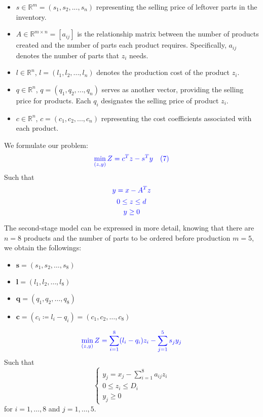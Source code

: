 \documentclass[a4paper]{article}
\begin{document}
	\begin{itemize}
		\item $s \in \mathbb{R}^m = (s_1, s_2, ..., s_n)$ representing the selling price of leftover parts in the inventory.
		\item $A \in \mathbb{R}^{m \times n} = [a_{ij}]$ is the relationship matrix between the number of products created and the number of parts each product requires. Specifically, $a_{ij}$ denotes the number of parts that $z_i$ needs.
	\end{itemize}
	\begin{itemize}
		\item $l \in \mathbb{R}^n$, $l = (l_1, l_2, ..., l_n)$ denotes the production cost of the product $z_i$.
		\item $q \in \mathbb{R}^n$, $q = (q_1, q_2, ..., q_n)$ serves as another vector, providing the selling price for products. Each $q_i$ designates the selling price of product $z_i$.
		\item $c \in \mathbb{R}^n$, $c = (c_1, c_2, ..., c_n)$ representing the cost coefficients associated with each product.
	\end{itemize}
	We formulate our problem:
	\[
	\textcolor{blue}{\min_{(z, y)} Z = c^T z - s^T y \quad (7)}
	\]
	{Such that}
	\[
	\textcolor{blue}{y = x - A^T z}
	\]
	\[
	\textcolor{blue}{0 \leq z \leq d}
	\]
	\[
	\textcolor{blue}{y \geq 0}
	\]
	
	The second-stage model can be expressed in more detail, knowing that there are \(n=8\) products and the number of parts to be ordered before production \(m=5\), we obtain the followings:
	\begin{itemize}
		\item $\mathbf{s} = (s_1, s_2, \ldots, s_8)$
		\item $\mathbf{l} = (l_1, l_2, \ldots, l_8)$
		\item $\mathbf{q} = (q_1, q_2, \ldots, q_8)$
		\item $\mathbf{c} = (c_i \coloneqq l_i - q_i) = (c_1, c_2, \ldots, c_8)$
	\end{itemize}
	\[
	\textcolor{blue}{
		\min_{(z, y)} Z = \sum_{i=1}^8 (l_i - q_i) z_i - \sum_{j=1}^5 s_j y_j
	}
	\]
	Such that
	\[
	\begin{cases}
		y_j = x_j - \sum_{i=1}^8 a_{ij} z_i \\
		0 \leq z_i \leq D_i \\
		y_j \geq 0
	\end{cases}
	\]
	for \(i=1,\ldots,8\) and \(j=1,\ldots,5\).
\end{document}
